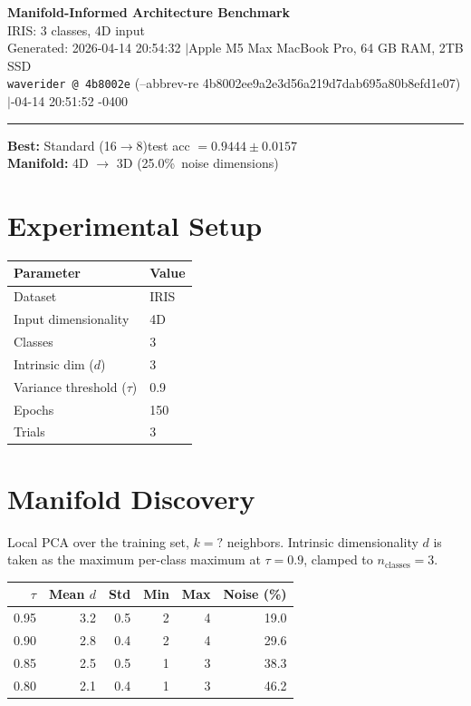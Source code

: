 \documentclass[11pt,letterpaper]{article}
\begin{document}
\begin{center}
  {\LARGE\bfseries\color{wavblue} Manifold-Informed Architecture Benchmark}\\[6pt]
  {\large IRIS: 3 classes, 4D input}\\[8pt]
  {\small Generated: 2026-04-14 20:54:32 \quad$|$\quad Apple M5 Max MacBook Pro, 64 GB RAM, 2TB SSD}\\[2pt]
  {\small\texttt{waverider @ 4b8002e} (--abbrev-re
4b8002ee9a2e3d56a219d7dab695a80b8efd1e07) \quad$|$-04-14 20:51:52 -0400}
\end{center}
{\color{wavblue}\noindent\rule{\linewidth}{1.5pt}}
\medskip

\noindent\colorbox{wavlight}{\parbox{\dimexpr\linewidth-2\fboxsep\relax}{
  \smallskip
  \textbf{Best:} Standard (16$\rightarrow$8)\quad test acc $= 0.9444 \pm 0.0157$\\[2pt]
  \textbf{Manifold:} 4D $\rightarrow$ 3D (25.0\%\ noise dimensions)\\[2pt]
  \smallskip
}}
\bigskip

\section{Experimental Setup}

\begin{tabular}{@{}ll@{}}
\toprule
\textbf{Parameter} & \textbf{Value} \\
\midrule
  Dataset & IRIS \\
  Input dimensionality & 4D \\
  Classes & 3 \\
  Intrinsic dim ($d$) & 3 \\
  Variance threshold ($\tau$) & 0.9 \\
  Epochs & 150 \\
  Trials & 3 \\
\bottomrule
\end{tabular}

\section{Manifold Discovery}

Local PCA over the training set, $k = ?$ neighbors. Intrinsic dimensionality $d$ is taken as the maximum per-class maximum at $\tau = 0.9$, clamped to $n_{\mathrm{classes}} = 3$.

\begin{tabular}{@{}rrrrrr@{}}
\toprule
$\tau$ & Mean $d$ & Std & Min & Max & Noise (\%) \\
\midrule
  0.95 & 3.2 & 0.5 & 2 & 4 & 19.0 \\
  0.90 & 2.8 & 0.4 & 2 & 4 & 29.6 \\
  0.85 & 2.5 & 0.5 & 1 & 3 & 38.3 \\
  0.80 & 2.1 & 0.4 & 1 & 3 & 46.2 \\
\bottomrule
\end{tabular}
\end{document}
